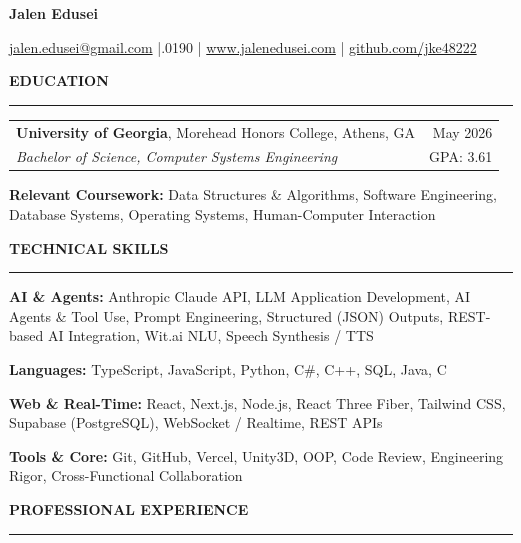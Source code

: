 \documentclass[letterpaper,10pt]{article}
\newcommand{\sectiontitle}[1]{%
  \vspace{6pt}%
  {\textbf{\large #1}}\par
  \vspace{-6pt}%
  \rule{\textwidth}{0.4pt}\par
  \vspace{3pt}%
}
\begin{document}
\begin{center}
    {\LARGE \textbf{Jalen Edusei}}\par
    \vspace{4pt}
    \href{mailto:jalen.edusei@gmail.com}{jalen.edusei@gmail.com} \;|.0190 \;|\;
    \href{https://www.jalenedusei.com}{www.jalenedusei.com} \;|\;
    \href{https://github.com/jke48222}{github.com/jke48222}
\end{center}

\sectiontitle{EDUCATION}
\begin{tabularx}{\textwidth}{@{}X r@{}}
\textbf{University of Georgia}, Morehead Honors College, Athens, GA & May 2026 \\
\textit{Bachelor of Science, Computer Systems Engineering} & GPA: 3.61 \\
\end{tabularx}\par
\vspace{2pt}
\textbf{Relevant Coursework:} Data Structures \& Algorithms, Software Engineering, Database Systems, Operating Systems, Human-Computer Interaction

\sectiontitle{TECHNICAL SKILLS}
\textbf{AI \& Agents:} Anthropic Claude API, LLM Application Development, AI Agents \& Tool Use, Prompt Engineering, Structured (JSON) Outputs, REST-based AI Integration, Wit.ai NLU, Speech Synthesis / TTS\par
\vspace{1pt}
\textbf{Languages:} TypeScript, JavaScript, Python, C\#, C++, SQL, Java, C\par
\vspace{1pt}
\textbf{Web \& Real-Time:} React, Next.js, Node.js, React Three Fiber, Tailwind CSS, Supabase (PostgreSQL), WebSocket / Realtime, REST APIs\par
\vspace{1pt}
\textbf{Tools \& Core:} Git, GitHub, Vercel, Unity3D, OOP, Code Review, Engineering Rigor, Cross-Functional Collaboration

\sectiontitle{PROFESSIONAL EXPERIENCE}
\end{document}
